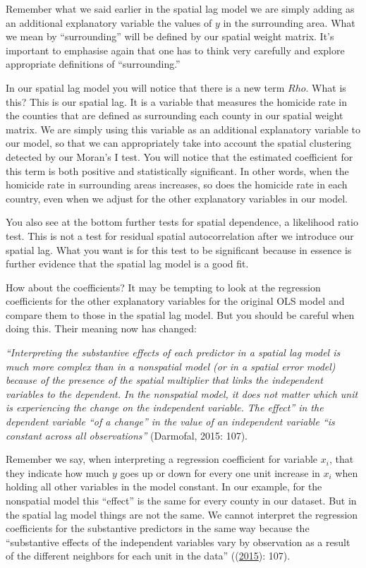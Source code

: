 \documentclass[
  krantz2]{krantz}
\begin{document}
Remember what we said earlier in the spatial lag model we are simply adding as an additional explanatory variable the values of \(y\) in the surrounding area. What we mean by ``surrounding'' will be defined by our spatial weight matrix. It's important to emphasise again that one has to think very carefully and explore appropriate definitions of ``surrounding.''

In our spatial lag model you will notice that there is a new term \(Rho\). What is this? This is our spatial lag. It is a variable that measures the homicide rate in the counties that are defined as surrounding each county in our spatial weight matrix. We are simply using this variable as an additional explanatory variable to our model, so that we can appropriately take into account the spatial clustering detected by our Moran's I test. You will notice that the estimated coefficient for this term is both positive and statistically significant. In other words, when the homicide rate in surrounding areas increases, so does the homicide rate in each country, even when we adjust for the other explanatory variables in our model.

You also see at the bottom further tests for spatial dependence, a likelihood ratio test. This is not a test for residual spatial autocorrelation after we introduce our spatial lag. What you want is for this test to be significant because in essence is further evidence that the spatial lag model is a good fit.

How about the coefficients? It may be tempting to look at the regression coefficients for the other explanatory variables for the original OLS model and compare them to those in the spatial lag model. But you should be careful when doing this. Their meaning now has changed:

\emph{``Interpreting the substantive effects of each predictor in a spatial lag model is much more complex than in a nonspatial model (or in a spatial error model) because of the presence of the spatial multiplier that links the independent variables to the dependent. In the nonspatial model, it does not matter which unit is experiencing the change on the independent variable. The effect'' in the dependent variable ``of a change'' in the value of an independent variable ``is constant across all observations''} (Darmofal, 2015: 107).

Remember we say, when interpreting a regression coefficient for variable \(x_i\), that they indicate how much \(y\) goes up or down for every one unit increase in \(x_i\) when holding all other variables in the model constant. In our example, for the nonspatial model this ``effect'' is the same for every county in our dataset. But in the spatial lag model things are not the same. We cannot interpret the regression coefficients for the substantive predictors in the same way because the ``substantive effects of the independent variables vary by observation as a result of the different neighbors for each unit in the data'' ((\protect\hyperlink{ref-Darmofal_2015}{2015}): 107).
\end{document}
